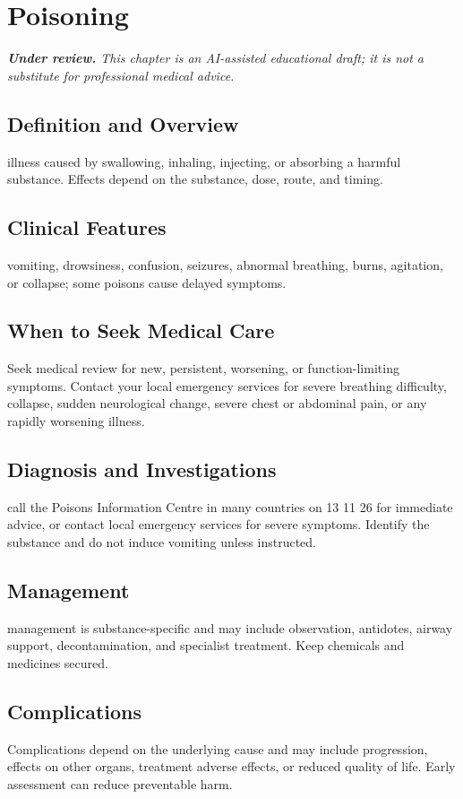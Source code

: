 \chapter{Poisoning}

\medskip
\noindent\textit{\textbf{Under review.} This chapter is an AI-assisted educational draft; it is not a substitute for professional medical advice.}

\section*{Definition and Overview}
illness caused by swallowing, inhaling, injecting, or absorbing a harmful substance. Effects depend on the substance, dose, route, and timing.

\section*{Clinical Features}
vomiting, drowsiness, confusion, seizures, abnormal breathing, burns, agitation, or collapse; some poisons cause delayed symptoms.

\section*{When to Seek Medical Care}
Seek medical review for new, persistent, worsening, or function-limiting symptoms. Contact your local emergency services for severe breathing difficulty, collapse, sudden neurological change, severe chest or abdominal pain, or any rapidly worsening illness.

\section*{Diagnosis and Investigations}
call the Poisons Information Centre in many countries on 13 11 26 for immediate advice, or contact local emergency services for severe symptoms. Identify the substance and do not induce vomiting unless instructed.

\section*{Management}
management is substance-specific and may include observation, antidotes, airway support, decontamination, and specialist treatment. Keep chemicals and medicines secured.

\section*{Complications}
Complications depend on the underlying cause and may include progression, effects on other organs, treatment adverse effects, or reduced quality of life. Early assessment can reduce preventable harm.


